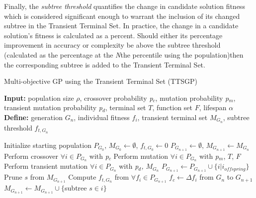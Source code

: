\documentclass[a4paper, twocolumn]{article}
\begin{document}
Finally, the \textit{subtree threshold} quantifies the change in candidate solution fitness which is considered significant enough to warrant the inclusion of its changed subtree in the Transient Terminal Set. In practice, the change in a candidate solution's fitness is calculated as a percent. Should either its percentage improvement in accuracy or complexity be above the subtree threshold (calculated as the percentage at the \textit{N}the percentile using the population)then the corresponding subtree is added to the Transient Terminal Set.
\begin{algorithm*}[h]
	\caption{Multi-objective GP using the Transient Terminal Set (TTSGP)}
	\hspace*{\algorithmicindent} \textbf{Input:} population size \(\rho\), crossover probability \textit{p$_{c}$}, mutation probability \textit{p$_{m}$}, transient mutation probability \textit{p$_{d}$}, terminal set \(T\), function set \(F\), lifespan \(\alpha\) \\
	\hspace*{\algorithmicindent} \textbf{Define:} generation \(G_{n}\), individual fitness \(f_{i}\), transient terminal set \(M_{G_{n}}\), subtree threshold \(f_{t, G_{n}}\) \\ 
	\begin{algorithmic}[1]
		\State Initialize starting population \textit{$ P_{G_{0}} $}, \(M_{G_{0}}\leftarrow \emptyset\), \(f_{t, G_{0}} \leftarrow 0\)
		 
		\State \(P_{G_{n+1}}\leftarrow \emptyset\), \(M_{G_{n+1}}\leftarrow M_{G_{n}}\)
			
		\State Perform crossover $\forall i\in P_{G_{n}}$ with \textit{p$_{c}$}
		\State Perform mutation $\forall i\in P_{G_{n}}$ with \textit{p$_{m}$}, \(T\), \(F\)
		\State Perform transient mutation $\forall i\in P_{G_{n}}$ with \textit{p$_{d}$, \(M_{G_{n}}\)}
		\State $P_{G_{n+1}} \leftarrow P_{G_{n+1}}\cup \{i | i_{offspring}\}$
		\EndWhile\newline
			
		\State Prune \(s\) from \(M_{G_{n+1}}\)
		\EndIf
		\EndFor
		\State Compute $f_{t, G_{n}}$ from $\forall f_{i} \in P_{G_{n+1}}$
		\State $f_{c}\leftarrow \Delta f_{i}$ from \(G_{n}\) to \(G_{n+1}\)
		\State \(M_{G_{n+1}} \leftarrow M_{G_{n+1}} \cup \{\)subtree \(s\in i \}\)
		\EndIf
		\EndFor 
		\EndWhile
\end{algorithmic}\end{algorithm*}
\end{document}
